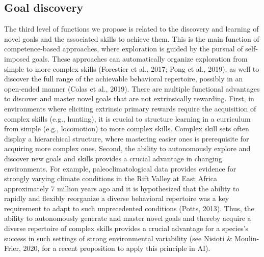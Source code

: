 \subsection{Goal discovery} The third level of functions we propose is related to the discovery and learning of novel goals and the associated skills to achieve them. This is the main function of competence-based approaches, where exploration is guided by the pursual of self-imposed goals. These approaches can automatically organize exploration from simple to more complex skills (Forestier et al., 2017; Pong et al., 2019), as well to discover the full range of the achievable behavioral repertoire, possibly in an open-ended manner (Colas et al., 2019). There are multiple functional advantages to discover and master novel goals that are not extrinsically rewarding. First, in environments where eliciting extrinsic primary rewards require the acquisition of complex skills (e.g., hunting), it is crucial to structure learning in a curriculum from simple (e.g., locomotion) to more complex skills. Complex skill sets often display a hierarchical structure, where mastering easier ones is prerequisite for acquiring more complex ones. Second, the ability to autonomously explore and discover new goals and skills provides a crucial advantage in changing environments. For example, paleoclimatological data provides evidence for strongly varying climate conditions in the Rift Valley at East Africa approximately 7 million years ago and it is hypothesized that the ability to rapidly and flexibly reorganize a diverse behavioral repertoire was a key requirement to adapt to such unprecedented conditions (Potts, 2013). Thus, the ability to autonomously generate and master novel goals and thereby acquire a diverse repertoire of complex skills provides a crucial advantage for a species's success in such settings of strong environmental variability (see Nisioti \& Moulin-Frier, 2020, for a recent proposition to apply this principle in AI).

